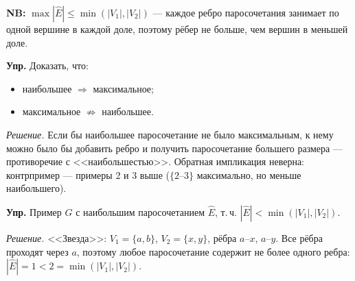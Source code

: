 \medskip
\textbf{NB:} $\max |\hat E| \leq \min(|V_1|, |V_2|)$ --- каждое ребро
паросочетания занимает по одной вершине в каждой доле, поэтому рёбер не
больше, чем вершин в меньшей доле.

\medskip
\textbf{Упр.} Доказать, что:
\begin{itemize}
  \item наибольшее $\Rightarrow$ максимальное;
  \item максимальное $\not\Rightarrow$ наибольшее.
\end{itemize}

\textit{Решение.} Если бы наибольшее паросочетание не было максимальным,
к нему можно было бы добавить ребро и получить паросочетание большего
размера --- противоречие с <<наибольшестью>>. Обратная импликация
неверна: контрпример --- примеры 2 и 3 выше ($\{2\text{--}3\}$
максимально, но меньше наибольшего).

\medskip
\textbf{Упр.} Пример $G$ с наибольшим паросочетанием $\hat{E}$, т.\,ч. $|\hat{E}| < \min(|V_1|, |V_2|)$.

\textit{Решение.} <<Звезда>>: $V_1 = \{a, b\}$, $V_2 = \{x, y\}$, рёбра
$a$--$x$, $a$--$y$. Все рёбра проходят через $a$, поэтому любое
паросочетание содержит не более одного ребра: $|\hat E| = 1 <
2 = \min(|V_1|, |V_2|)$.



